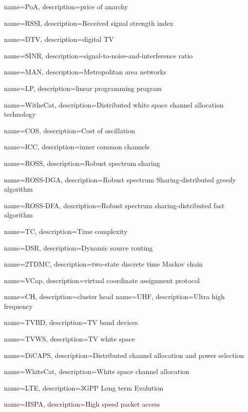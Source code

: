 {
    name=PoA,
    description={price of anarchy}
}


{
    name=RSSI,
    description={Received signal strength index}
}


{
    name=DTV,
    description={digital TV}
}

{
    name=SINR,
    description={signal-to-noise-and-interference ratio}
}

{
    name=MAN,
    description={Metropolitan area networks}
}

{
    name=LP,
    description={linear programming program}
}

{
    name=WitheCat,
    description={Distributed white space channel allocation technology}
}

{
    name=COS,
    description={Cost of oscillation}
}

{
    name=ICC,
    description={inner common channels}
}

{
    name=ROSS,
    description={Robust spectrum sharing}
}

{
    name=ROSS-DGA,
    description={Robust spectrum Sharing-distributed greedy algorithm}
}

{
    name=ROSS-DFA,
    description={Robust spectrum sharing-distributed fast algorithm}
}


{
    name=TC,
    description={Time complexity}
}

{
    name=DSR,
    description={Dynamic source routing}
}

{
    name=2TDMC,
    description={two-state discrete time Markov chain}
}

{
    name=VCap,
    description={virtual coordinate assignment protocol}
}


{
    name=CH,
    description={cluster head}
}
{
    name=UHF,
    description={Ultra high frequency}
}


{
    name=TVBD,
    description={TV band devices}
}

{
    name=TVWS,
    description={TV white space}
}

{
    name=DiCAPS,
    description={Distributed channel allocation and power selection}
}

{
    name=WhiteCat,
    description={White space channel allocation}
}

{
    name=LTE,
    description={3GPP Long term Evolution}
}

{
    name=HSPA,
    description={High speed packet access}
}
